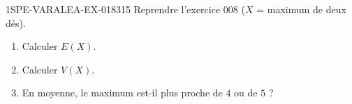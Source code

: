 \begin{exercice}{1SPE-VARALEA-EX-018}{3}{15}
Reprendre l'exercice 008 ($X$ = maximum de deux dés).

\begin{enumerate}
  \item Calculer $E(X)$.
  \item Calculer $V(X)$.
  \item En moyenne, le maximum est-il plus proche de $4$ ou de $5$ ?
\end{enumerate}
\end{exercice}
